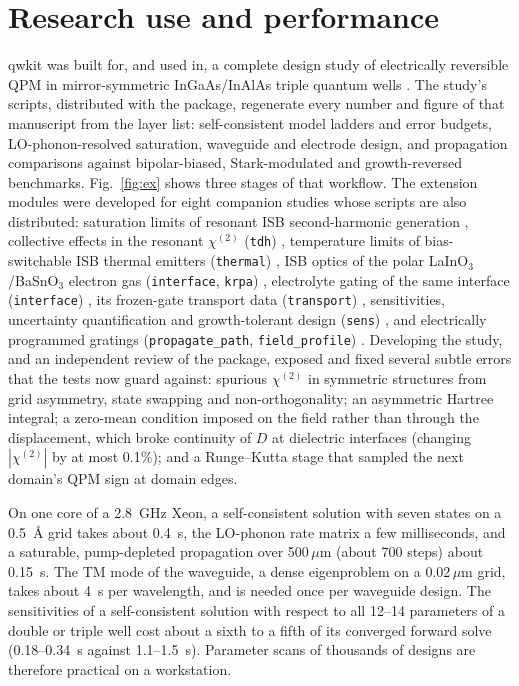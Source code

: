 \documentclass[11pt]{article}
\newcommand{\chitwo}{\chi^{(2)}}
\newcommand{\um}{\,\mu\mathrm{m}}
\newcommand{\code}[1]{\texttt{#1}}
\begin{document}
\section{Research use and performance}
qwkit was built for, and used in, a complete design study of electrically reversible QPM in mirror-symmetric InGaAs/InAlAs triple quantum wells \cite{Ownby2026N1}. The study's scripts, distributed with the package, regenerate every number and figure of that manuscript from the layer list: self-consistent model ladders and error budgets, LO-phonon-resolved saturation, waveguide and electrode design, and propagation comparisons against bipolar-biased, Stark-modulated and growth-reversed benchmarks. Fig.~\ref{fig:ex} shows three stages of that workflow. The extension modules were developed for eight companion studies whose scripts are also distributed: saturation limits of resonant ISB second-harmonic generation \cite{OwnbyNL02}, collective effects in the resonant $\chitwo$ (\code{tdh}) \cite{OwnbyNL05}, temperature limits of bias-switchable ISB thermal emitters (\code{thermal}) \cite{OwnbyTPV05}, ISB optics of the polar LaInO$_3$/BaSnO$_3$ electron gas (\code{interface}, \code{krpa}) \cite{OwnbyMAT01}, electrolyte gating of the same interface (\code{interface}) \cite{OwnbyMAT02}, its frozen-gate transport data (\code{transport}) \cite{OwnbyMAT03}, sensitivities, uncertainty quantification and growth-tolerant design (\code{sens}) \cite{OwnbyMS02}, and electrically programmed gratings (\code{propagate\_path}, \code{field\_profile}) \cite{OwnbyN2}. Developing the study, and an independent review of the package, exposed and fixed several subtle errors that the tests now guard against: spurious $\chitwo$ in symmetric structures from grid asymmetry, state swapping and non-orthogonality; an asymmetric Hartree integral; a zero-mean condition imposed on the field rather than through the displacement, which broke continuity of $D$ at dielectric interfaces (changing $|\chitwo|$ by at most 0.1\%); and a Runge--Kutta stage that sampled the next domain's QPM sign at domain edges.

On one core of a 2.8~GHz Xeon, a self-consistent solution with seven states on a 0.5~\AA{} grid takes about 0.4~s, the LO-phonon rate matrix a few milliseconds, and a saturable, pump-depleted propagation over 500$\um$ (about 700 steps) about 0.15~s. The TM mode of the waveguide, a dense eigenproblem on a 0.02$\um$ grid, takes about 4~s per wavelength, and is needed once per waveguide design. The sensitivities of a self-consistent solution with respect to all 12--14 parameters of a double or triple well cost about a sixth to a fifth of its converged forward solve (0.18--0.34~s against 1.1--1.5~s). Parameter scans of thousands of designs are therefore practical on a workstation.
\end{document}
